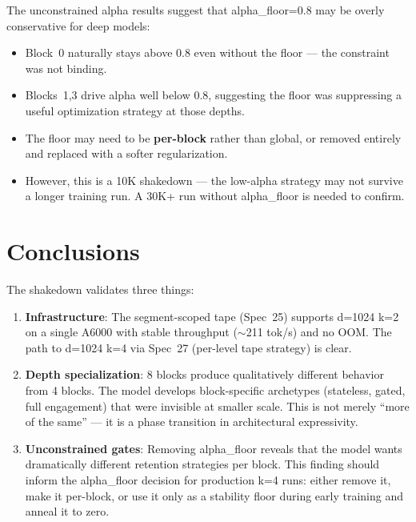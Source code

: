 \documentclass[11pt,a4paper]{article}
\begin{document}
The unconstrained alpha results suggest that alpha\_floor=0.8 may be overly conservative for deep models:
\begin{itemize}
    \item Block~0 naturally stays above 0.8 even without the floor --- the constraint was not binding.
    \item Blocks~1,3 drive alpha well below 0.8, suggesting the floor was suppressing a useful optimization strategy at those depths.
    \item The floor may need to be \textbf{per-block} rather than global, or removed entirely and replaced with a softer regularization.
    \item However, this is a 10K shakedown --- the low-alpha strategy may not survive a longer training run. A 30K+ run without alpha\_floor is needed to confirm.
\end{itemize}

\section{Conclusions}

The shakedown validates three things:

\begin{enumerate}
    \item \textbf{Infrastructure}: The segment-scoped tape (Spec~25) supports d=1024 k=2 on a single A6000 with stable throughput ($\sim$211 tok/s) and no OOM. The path to d=1024 k=4 via Spec~27 (per-level tape strategy) is clear.

    \item \textbf{Depth specialization}: 8 blocks produce qualitatively different behavior from 4 blocks. The model develops block-specific archetypes (stateless, gated, full engagement) that were invisible at smaller scale. This is not merely ``more of the same'' --- it is a phase transition in architectural expressivity.

    \item \textbf{Unconstrained gates}: Removing alpha\_floor reveals that the model wants dramatically different retention strategies per block. This finding should inform the alpha\_floor decision for production k=4 runs: either remove it, make it per-block, or use it only as a stability floor during early training and anneal it to zero.
\end{enumerate}
\end{document}
